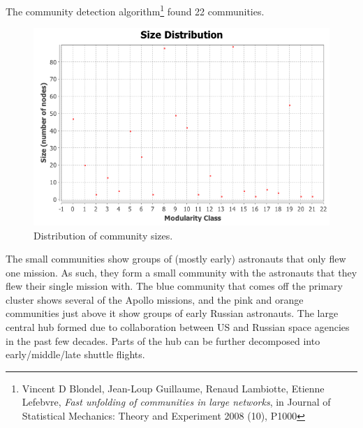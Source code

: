 \documentclass{tufte-handout}
\begin{document}
The community detection algorithm\footnote{Vincent D Blondel, Jean-Loup Guillaume, Renaud Lambiotte, Etienne Lefebvre, \emph{Fast unfolding of communities in large networks}, in Journal of Statistical Mechanics: Theory and Experiment 2008 (10), P1000} found 22 communities.

\begin{figure}
  \includegraphics{communities-size-distribution.png}
  \caption{Distribution of community sizes.
  }
  \label{fig:textfig}
\end{figure}

The small communities show groups of (mostly early) astronauts that only flew one mission. As such, they form a small community with the astronauts that they flew their single mission with. The blue community that comes off the primary cluster shows several of the Apollo missions, and the pink and orange communities just above it show groups of early Russian astronauts. The large central hub formed due to collaboration between US and Russian space agencies in the past few decades. Parts of the hub can be further decomposed into early/middle/late shuttle flights.
\end{document}
